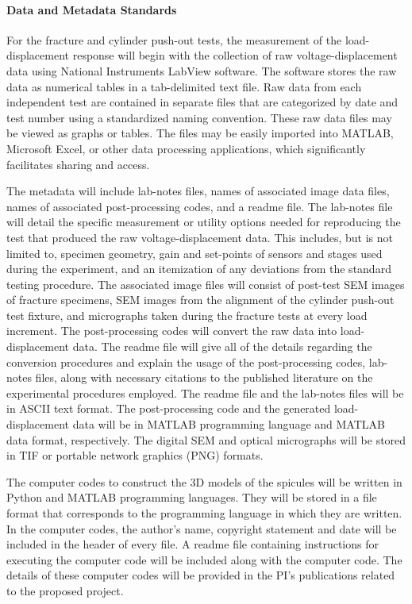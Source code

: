 \documentclass[10 pt, letterpaper]{article}
\begin{document}
\paragraph{Data and Metadata Standards}

For the fracture and cylinder push-out tests, the measurement of the load-displacement response will begin with the collection of raw voltage-displacement data using National Instruments LabView software. The software stores the raw data as numerical tables in a tab-delimited text file. Raw data from each independent test are contained in separate files that are categorized by date and test number using a standardized naming convention. These raw data files may be viewed as graphs or tables. The files may be easily imported into MATLAB, Microsoft Excel, or other data processing applications, which significantly facilitates sharing and access. 

The metadata will include lab-notes files, names of associated image data files, names of associated post-processing codes, and a readme file. The lab-notes file will detail the specific measurement or utility options needed for reproducing the test that produced the raw voltage-displacement data. This includes, but is not limited to, specimen geometry, gain and set-points of sensors and stages used during the experiment, and an itemization of any deviations from the standard testing procedure. The associated image files will consist of post-test SEM images of fracture specimens, SEM images from the alignment of the cylinder push-out test fixture, and micrographs taken during the fracture tests at every load increment. The post-processing codes will convert the raw data into load-displacement data.  The readme file will give all of the details regarding the conversion procedures and explain the usage of the post-processing codes, lab-notes files, along with necessary citations to the published literature on the experimental procedures employed.  The readme file and the lab-notes files will be in ASCII text format. The post-processing code and the generated load-displacement data will be in MATLAB programming language and MATLAB data format, respectively. The digital SEM and optical micrographs will be stored in TIF or portable network graphics (PNG) formats.

The computer codes to construct the 3D models of the spicules will be written in Python and MATLAB programming languages. They will be stored in a file format that corresponds to the programming language in which they are written. In the computer codes, the author's name, copyright statement and date will be included in the header of every file. A readme file containing instructions for executing the computer code will be included along with the computer code. The details of these computer codes will be provided in the PI's publications related to the proposed project.
\end{document}
